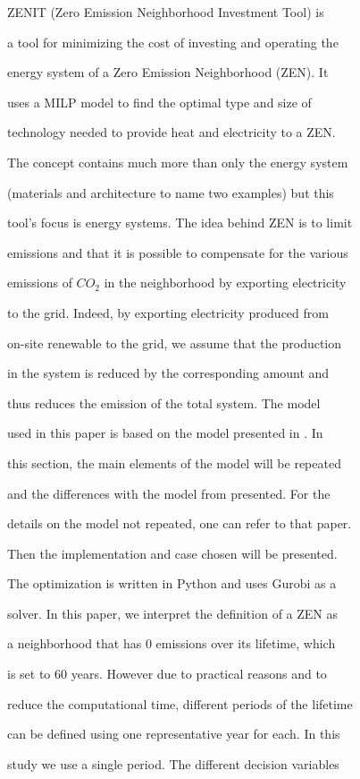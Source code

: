 \documentclass[a4paper,12pt]{article}
\begin{document}
ZENIT (Zero Emission Neighborhood Investment Tool) is

a tool for minimizing the cost of investing and operating the

energy system of a Zero Emission Neighborhood (ZEN). It

uses a MILP model to find the optimal type and size of

technology needed to provide heat and electricity to a ZEN.

The concept contains much more than only the energy system

(materials and architecture to name two examples) but this

tool’s focus is energy systems. The idea behind ZEN is to limit

emissions and that it is possible to compensate for the various

emissions of $CO_{2}$ in the neighborhood by exporting electricity

to the grid. Indeed, by exporting electricity produced from

on-site renewable to the grid, we assume that the production

in the system is reduced by the corresponding amount and

thus reduces the emission of the total system. The model

used in this paper is based on the model presented in . In

this section, the main elements of the model will be repeated

and the differences with the model from presented. For the

details on the model not repeated, one can refer to that paper.

Then the implementation and case chosen will be presented.

The optimization is written in Python and uses Gurobi as a

solver. In this paper, we interpret the definition of a ZEN as

a neighborhood that has $0$ emissions over its lifetime, which

is set to 60 years. However due to practical reasons and to

reduce the computational time, different periods of the lifetime

can be defined using one representative year for each. In this

study we use a single period. The different decision variables
\end{document}
